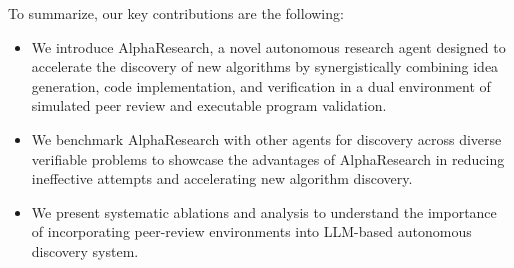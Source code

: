 

To summarize, our key contributions are the following: 
\begin{itemize}[leftmargin=*]
\itemsep0em
    \item We introduce AlphaResearch, a novel autonomous research agent designed to accelerate the discovery of new algorithms by synergistically combining idea generation, code implementation, and verification in a dual environment of simulated peer review and executable program validation.
    \item We benchmark AlphaResearch with other agents for discovery across diverse verifiable problems to showcase the advantages of AlphaResearch in reducing ineffective attempts and accelerating new algorithm discovery.
    \item We present systematic ablations and analysis to understand the importance of incorporating peer-review environments into LLM-based autonomous discovery system.
\end{itemize}

